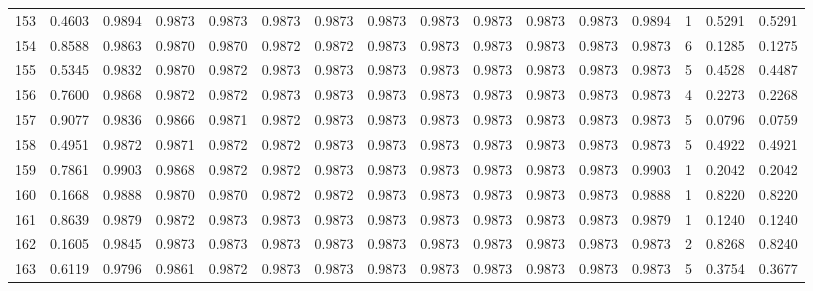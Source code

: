 \begin{tabular}{lrrrrrrrrrrrrrrr}
153 &      0.4603 &  0.9894 &  0.9873 &  0.9873 &  0.9873 &  0.9873 &  0.9873 &  0.9873 &  0.9873 &  0.9873 &   0.9873 &     0.9894 &      1 &                    0.5291 &                     0.5291 \\
154 &      0.8588 &  0.9863 &  0.9870 &  0.9870 &  0.9872 &  0.9872 &  0.9873 &  0.9873 &  0.9873 &  0.9873 &   0.9873 &     0.9873 &      6 &                    0.1285 &                     0.1275 \\
155 &      0.5345 &  0.9832 &  0.9870 &  0.9872 &  0.9873 &  0.9873 &  0.9873 &  0.9873 &  0.9873 &  0.9873 &   0.9873 &     0.9873 &      5 &                    0.4528 &                     0.4487 \\
156 &      0.7600 &  0.9868 &  0.9872 &  0.9872 &  0.9873 &  0.9873 &  0.9873 &  0.9873 &  0.9873 &  0.9873 &   0.9873 &     0.9873 &      4 &                    0.2273 &                     0.2268 \\
157 &      0.9077 &  0.9836 &  0.9866 &  0.9871 &  0.9872 &  0.9873 &  0.9873 &  0.9873 &  0.9873 &  0.9873 &   0.9873 &     0.9873 &      5 &                    0.0796 &                     0.0759 \\
158 &      0.4951 &  0.9872 &  0.9871 &  0.9872 &  0.9872 &  0.9873 &  0.9873 &  0.9873 &  0.9873 &  0.9873 &   0.9873 &     0.9873 &      5 &                    0.4922 &                     0.4921 \\
159 &      0.7861 &  0.9903 &  0.9868 &  0.9872 &  0.9872 &  0.9873 &  0.9873 &  0.9873 &  0.9873 &  0.9873 &   0.9873 &     0.9903 &      1 &                    0.2042 &                     0.2042 \\
160 &      0.1668 &  0.9888 &  0.9870 &  0.9870 &  0.9872 &  0.9872 &  0.9873 &  0.9873 &  0.9873 &  0.9873 &   0.9873 &     0.9888 &      1 &                    0.8220 &                     0.8220 \\
161 &      0.8639 &  0.9879 &  0.9872 &  0.9873 &  0.9873 &  0.9873 &  0.9873 &  0.9873 &  0.9873 &  0.9873 &   0.9873 &     0.9879 &      1 &                    0.1240 &                     0.1240 \\
162 &      0.1605 &  0.9845 &  0.9873 &  0.9873 &  0.9873 &  0.9873 &  0.9873 &  0.9873 &  0.9873 &  0.9873 &   0.9873 &     0.9873 &      2 &                    0.8268 &                     0.8240 \\
163 &      0.6119 &  0.9796 &  0.9861 &  0.9872 &  0.9873 &  0.9873 &  0.9873 &  0.9873 &  0.9873 &  0.9873 &   0.9873 &     0.9873 &      5 &                    0.3754 &                     0.3677 \\

\end{tabular}
